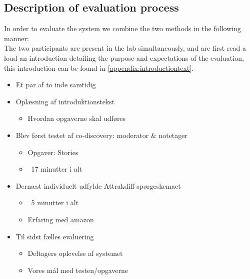 \subsection{Description of evaluation process}
In order to evaluate the system we combine the two methods in the following manner: \\
The two participants are present in the lab simultaneously, and are first read a loud an introduction detailing the purpose and expectations of the evaluation, this introduction can be found in \autoref{appendix:introductiontext}. 
\begin{itemize}
\item Et par af to inde samtidig
\item Oplæsning af introduktionstekst
\begin{itemize}
\item Hvordan opgaverne skal udføres
\end{itemize}
\item Blev først testet af co-discovery: moderator \& notetager
\begin{itemize}
\item Opgaver: Stories
\item ~17 minutter i alt
\end{itemize}
\item Dern\ae st individuelt udfylde Attrakdiff spørgeskemaet
\begin{itemize}
\item ~5 minutter i alt
\item Erfaring med amazon
\end{itemize}
\item Til sidst fælles evaluering
\begin{itemize}
\item Deltagers oplevelse af systemet
\item Vores m\aa l med testen/opgaverne
\end{itemize}
\end{itemize}